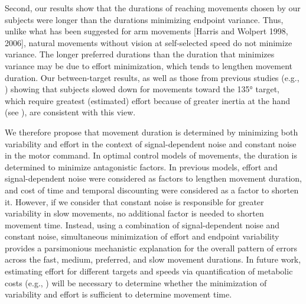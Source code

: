 Second, our results show that the durations of reaching movements chosen by our subjects were longer than the durations minimizing endpoint variance. Thus, unlike what has been suggested for arm movements [Harris and Wolpert 1998, 2006], natural movements without vision at self-selected speed do not minimize variance. The longer preferred durations than the duration that minimizes variance may be due to effort minimization, which tends to lengthen movement duration. Our between-target results, as well as those from previous studies (e.g., \cite{Gordon1994, Park2016}) showing that subjects slowed down for movements toward the \ang{135} target, which require greatest (estimated) effort because of greater inertia at the hand (see \cite{Schweighofer2015}), are consistent with this view.

We therefore propose that movement duration is determined by minimizing both variability and effort in the context of signal-dependent noise and constant noise in the motor command. In optimal control models of movements, the duration is determined to minimize antagonistic factors. In previous models, effort and signal-dependent noise were considered as factors to lengthen movement duration, and cost of time \cite{Hoff1994} and temporal discounting \cite{Haith2012, Rigoux2012, Shadmehr2010} were considered as a factor to shorten it. However, if we consider that constant noise is responsible for greater variability in slow movements, no additional factor is needed to shorten movement time. Instead, using a combination of signal-dependent noise and constant noise, simultaneous minimization of effort and endpoint variability provides a parsimonious mechanistic explanation for the overall pattern of errors across the fast, medium, preferred, and slow movement durations. In future work, estimating effort for different targets and speeds via quantification of metabolic costs (e.g., \cite{Huang2012}) will be necessary to determine whether the minimization of variability and effort is sufficient to determine movement time.


